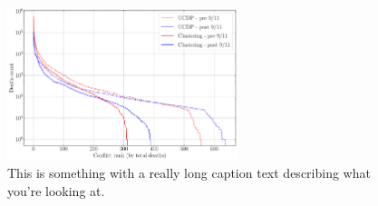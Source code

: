 \documentclass{01_preamble/classicreport}
\begin{document}
\begin{figure}
    \includegraphics[width=0.6\textwidth]{02_figures/deathcomparison.pdf}
    \caption[This is something]{This is something with a really long caption text describing what you're looking at.}
\end{figure}

\blindtext[5]

\newpage
{\small

}
\end{document}
